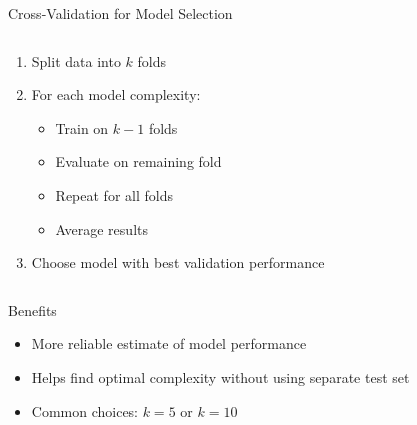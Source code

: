 \documentclass{beamer}
\begin{document}
\begin{frame}{Cross-Validation for Model Selection}
  \begin{columns}
    \begin{column}{0.6\textwidth}
      \begin{enumerate}
        \item Split data into $k$ folds
        \item For each model complexity:
        \begin{itemize}
          \item Train on $k-1$ folds
          \item Evaluate on remaining fold
          \item Repeat for all folds
          \item Average results
        \end{itemize}
        \item Choose model with best validation performance
      \end{enumerate}
    \end{column}
    
    \begin{column}{0.4\textwidth}
      \begin{center}
      \end{center}
    \end{column}
  \end{columns}
  
  \begin{block}{Benefits}
    \begin{itemize}
      \item More reliable estimate of model performance
      \item Helps find optimal complexity without using separate test set
      \item Common choices: $k=5$ or $k=10$
    \end{itemize}
  \end{block}
\end{frame}
\end{document}
